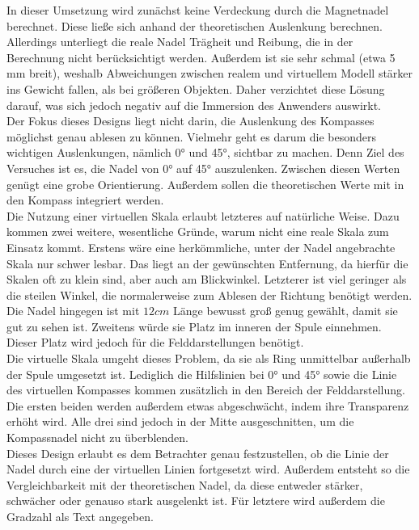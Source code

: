 In dieser Umsetzung wird zunächst keine Verdeckung durch die Magnetnadel berechnet. Diese ließe sich anhand der theoretischen Auslenkung berechnen. Allerdings unterliegt die reale Nadel Trägheit und Reibung, die in der Berechnung nicht berücksichtigt werden. Außerdem ist sie sehr schmal (etwa 5 mm breit), weshalb Abweichungen zwischen realem und virtuellem Modell stärker ins Gewicht fallen, als bei größeren Objekten. Daher verzichtet diese Lösung darauf, was sich jedoch negativ auf die Immersion des Anwenders auswirkt.\\


Der Fokus dieses Designs liegt nicht darin, die Auslenkung des Kompasses möglichst genau ablesen zu können. Vielmehr geht es darum die besonders wichtigen Auslenkungen, nämlich 0° und 45°, sichtbar zu machen. Denn Ziel des Versuches ist es, die Nadel von 0° auf 45° auszulenken. Zwischen diesen Werten genügt eine grobe Orientierung. Außerdem sollen die theoretischen Werte mit in den Kompass integriert werden.\\

Die Nutzung einer virtuellen Skala erlaubt letzteres auf natürliche Weise. Dazu kommen zwei weitere, wesentliche Gründe, warum nicht eine reale Skala zum Einsatz kommt. Erstens wäre eine herkömmliche, unter der Nadel angebrachte Skala nur schwer lesbar. Das liegt an der gewünschten Entfernung, da hierfür die Skalen oft zu klein sind, aber auch am Blickwinkel. Letzterer ist viel geringer als die steilen Winkel, die normalerweise zum Ablesen der Richtung benötigt werden. Die Nadel hingegen ist mit $12 cm$ Länge bewusst groß genug gewählt, damit sie gut zu sehen ist. Zweitens würde sie Platz im inneren der Spule einnehmen. Dieser Platz wird jedoch für die Felddarstellungen benötigt.\\

Die virtuelle Skala umgeht dieses Problem, da sie als Ring unmittelbar außerhalb der Spule umgesetzt ist. Lediglich die Hilfslinien bei 0° und 45° sowie die Linie des virtuellen Kompasses kommen zusätzlich in den Bereich der Felddarstellung. Die ersten beiden werden außerdem etwas abgeschwächt, indem ihre Transparenz erhöht wird. Alle drei sind jedoch in der Mitte ausgeschnitten, um die Kompassnadel nicht zu überblenden.\\

Dieses Design erlaubt es dem Betrachter genau festzustellen, ob die Linie der Nadel durch eine der virtuellen Linien fortgesetzt wird. Außerdem entsteht so die Vergleichbarkeit mit der theoretischen Nadel, da diese entweder stärker, schwächer oder genauso stark ausgelenkt ist. Für letztere wird außerdem die Gradzahl als Text angegeben.\\


